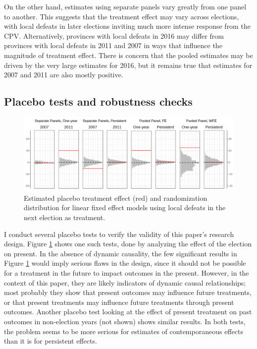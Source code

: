 \documentclass[12pt]{article}\usepackage[]{graphicx}\usepackage[]{color}
\newcommand{\1}{\mathbbm{1}}
\begin{document}
On the other hand, estimates using separate panels vary greatly from one panel to another. This suggests that the treatment effect may vary across elections, with local defeats in later elections inviting much more intense response from the CPV. Alternatively, provinces with local defeats in 2016 may differ from provinces with local defeats in 2011 and 2007 in ways that influence the magnitude of treatment effect. There is concern that the pooled estimates may be driven by the very large estimates for 2016, but it remains true that estimates for 2007 and 2011 are also mostly positive.

\subsection{Placebo tests and robustness checks}

\begin{figure}[!htbp]
	\centering
	\includegraphics[width=\textwidth]{figure/SYP_FE_PLACE.png}
	\captionsetup{singlelinecheck=off}
	\caption[Estimated effects of future treatment]{Estimated placebo treatment effect (red) and randomization distribution for linear fixed effect models using local defeats in the next election as treatment.}
	\label{fig:Place}
\end{figure}

I conduct several placebo tests to verify the validity of this paper's research design. Figure \ref{fig:Place} shows one such tests, done by analyzing the effect of the  election on present. In the absence of dynamic causality, the few significant results in Figure \ref{fig:Place} would imply serious flaws in the design, since it should not be possible for a treatment in the future to impact outcomes in the present. However, in the context of this paper, they are likely indicators of dynamic causal relationships; most probably they show that present outcomes may influence future treatments, or that present treatments may influence future treatments through present outcomes. Another placebo test looking at the effect of present treatment on past outcomes in non-election years (not shown) shows similar results. In both tests, the problem seems to be more serious for estimates of contemporaneous effects than it is for persistent effects.
\end{document}

